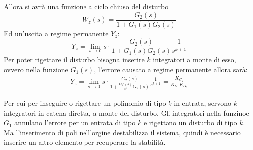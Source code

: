 \documentclass{article}
\numberwithin{equation}{subsection}
\begin{document}
\begin{center}\end{center}

Allora si avrà una funzione a ciclo chiuso del disturbo:
\begin{equation}
    W_z(s)=\displaystyle\frac{G_2(s)}{1+G_1(s)G_2(s)}
\end{equation}
Ed un'uscita a regime permanente $Y_z$:
\begin{equation}
    Y_z=\lim_{s\to0}s\cdot\displaystyle\frac{G_2(s)}{1+G_1(s)G_2(s)}\frac{1}{s^{k+1}}
\end{equation}
Per poter rigettare il disturbo bisogna inserire $k$ integratori a monte di esso, ovvero nella funzione $G_1(s)$, l'errore causato a regime permanente allora sarà:
\begin{gather}
    Y_z=\lim_{s\to0}s\cdot\displaystyle\frac{G_2(s)}{1+\displaystyle\frac{G_1'(s)}{s^k}G_2(s)}\frac{1}{s^{k+1}}=\frac{K_{G_2}}{K_{G_1}K_{G_2}}
\end{gather}

Per cui per inseguire o rigettare un polinomio di tipo $k$ in entrata, servono $k$ integratori in catena diretta, a monte del disturbo. Gli integratori nella funzinoe $G_1$ 
annulano l'errore per un entrata di tipo $k$ e rigettano un disturbo di tipo $k$. Ma l'inserimento di poli nell'orgine 
destabilizza il sistema, quindi è necessario inserire un altro elemento per recuperare la stabilità. \\ 
\end{document}
